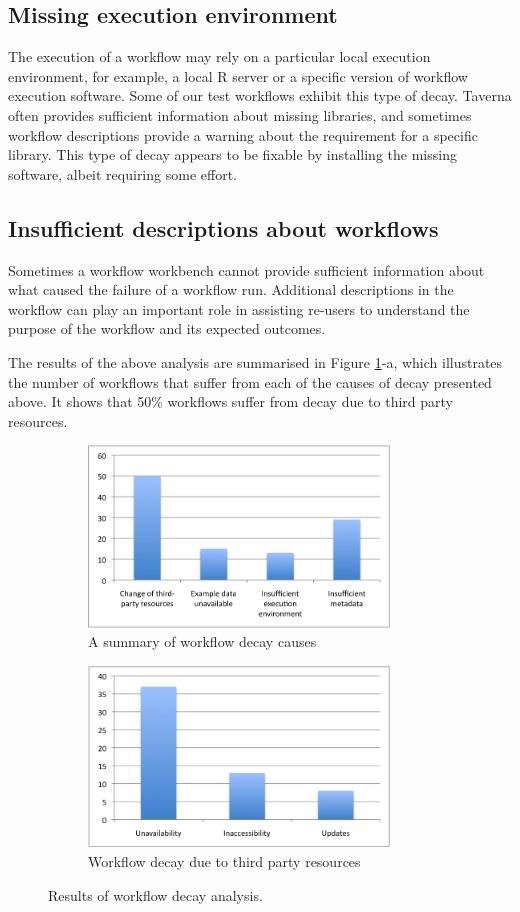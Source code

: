 \subsection{Missing execution environment}
The execution of a workflow may rely on a particular local execution environment, for example, a local R server or a specific version of workflow execution software. Some of our test workflows exhibit this type of decay. Taverna often provides sufficient information about missing libraries, and sometimes workflow descriptions provide a warning about the requirement for a specific library. This type of decay appears to be fixable by installing the missing software, albeit requiring some effort.

\subsection{Insufficient descriptions about workflows}
Sometimes a workflow workbench cannot provide sufficient information about what caused the failure of a workflow run. Additional descriptions in the workflow can play an important role in assisting re-users to understand the purpose of the workflow and its expected outcomes.



The results of the above analysis are summarised in Figure \ref{fig:decay-analysis}-a, which illustrates the number of workflows that suffer from each of the causes of decay presented above. It shows that {50\%} workflows suffer from decay due to third party resources. 

\begin{figure}[ht]
\centering
\begin{subfigure}[t]{8.25cm}
  \includegraphics[width=8cm]{./Figures/decay_analysis_chart1-v2.png}
  \caption{A summary of workflow decay causes}
\end{subfigure}
\begin{subfigure}[t]{8.25cm}
  \includegraphics[width=8cm]{./Figures/decay_analysis_chart2-v2.png}
  \caption{Workflow decay due to third party resources}
\end{subfigure}
\caption{Results of workflow decay analysis.}
\label{fig:decay-analysis}
\end{figure}


